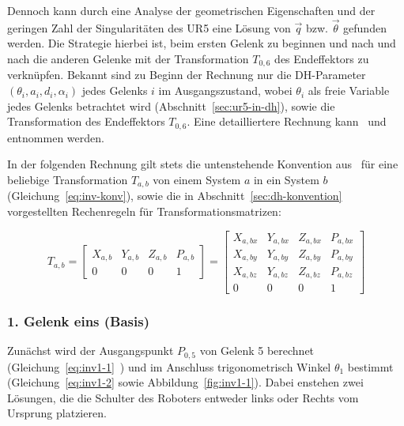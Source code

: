 Dennoch kann durch eine Analyse der geometrischen Eigenschaften und der geringen Zahl der Singularitäten des UR5 eine Lösung von $\overrightarrow{q}$ bzw. $\overrightarrow{\theta}$ gefunden werden.
Die Strategie hierbei ist, beim ersten Gelenk zu beginnen und nach und nach die anderen Gelenke mit der Transformation $T_{0,6}$ des Endeffektors zu verknüpfen.
Bekannt sind zu Beginn der Rechnung nur die DH-Parameter $(\theta_i, a_i, d_i, \alpha_i)$ jedes Gelenks $i$ im Ausgangszustand, wobei $\theta_i$ als freie Variable jedes Gelenks betrachtet wird (Abschnitt~\ref{sec:ur5-in-dh}), sowie die Transformation des Endeffektors $T_{0,6}$.
Eine detailliertere Rechnung kann~\cite{rasmusandersenKinematicsUR52018} und~\cite{hawkinsAnalyticInverseKinematics2013} entnommen werden.

In der folgenden Rechnung gilt stets die untenstehende Konvention aus~\cite[82]{craigIntroductionRoboticsMechanics2009} für eine beliebige Transformation $T_{a,b}$ von einem System $a$ in ein System $b$ (Gleichung~\ref{eq:inv-konv}), sowie die in Abschnitt~\ref{sec:dh-konvention} vorgestellten Rechenregeln für Transformationsmatrizen:

\begin{equation}
    T_{a,b} = \begin{bmatrix}
                  X_{a,b} & Y_{a,b} & Z_{a,b} & P_{a,b} \\
                  0       & 0       & 0       & 1
    \end{bmatrix}
    = \begin{bmatrix}
          X_{a,bx} & Y_{a,bx} & Z_{a,bx} & P_{a,bx} \\
          X_{a,by} & Y_{a,by} & Z_{a,by} & P_{a,by} \\
          X_{a,bz} & Y_{a,bz} & Z_{a,bz} & P_{a,bz} \\
          0        & 0        & 0        & 1
    \end{bmatrix}
    \label{eq:inv-konv}
\end{equation}

\subsubsection{1. Gelenk eins (Basis)}

Zunächst wird der Ausgangspunkt $P_{0,5}$ von Gelenk 5 berechnet (Gleichung~\ref{eq:inv1-1}~\cite[4]{rasmusandersenKinematicsUR52018}) und im Anschluss trigonometrisch Winkel $\theta_1$ bestimmt (Gleichung~\ref{eq:inv1-2} sowie Abbildung~\ref{fig:inv1-1}).
Dabei enstehen zwei Lösungen, die die Schulter des Roboters entweder links oder Rechts vom Ursprung platzieren.

